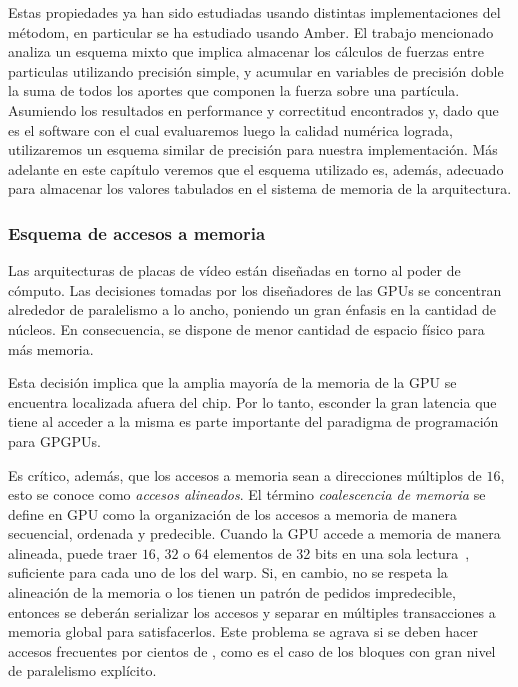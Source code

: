 Estas propiedades ya han sido estudiadas usando distintas implementaciones del métodom, en particular se ha estudiado usando Amber\cite{le2013spfp}. 
El trabajo mencionado analiza un esquema mixto que implica almacenar los cálculos de fuerzas entre particulas utilizando precisión simple, y acumular en variables de precisión doble
la suma de todos los aportes que componen la fuerza sobre una partícula. Asumiendo los resultados en performance y correctitud encontrados y,
dado que es el software con el cual evaluaremos luego la calidad numérica lograda, utilizaremos un esquema similar de precisión para nuestra implementación.
Más adelante en este capítulo veremos que el esquema utilizado es, además, adecuado para almacenar los valores tabulados en el sistema de memoria de la arquitectura.

\subsubsection{Esquema de accesos a memoria}

Las arquitecturas de placas de v\'ideo est\'an dise\~nadas en torno al poder de c\'omputo.
Las decisiones tomadas por los dise\~nadores de las GPUs se concentran alrededor de paralelismo a lo ancho, poniendo un gran \'enfasis en la cantidad de n\'ucleos.
En consecuencia, se dispone de menor cantidad de espacio f\'isico para m\'as memoria.

Esta decisi\'on implica que la amplia mayor\'ia de la memoria de la GPU se encuentra localizada afuera del chip.
Por lo tanto, esconder la gran latencia que tiene al acceder a la misma es parte importante del paradigma de programaci\'on para GPGPUs.

Es cr\'itico, adem\'as, que los accesos a memoria sean a direcciones m\'ultiplos de $16$, esto se conoce como \textit{accesos alineados}.
El t\'ermino \emph{coalescencia de memoria} se define en GPU como la organizaci\'on de los accesos a memoria de manera secuencial, ordenada y predecible.
Cuando la GPU accede a memoria de manera alineada, puede traer $16$, $32$ o $64$ elementos de 32 bits en una sola lectura~\cite{cudaProgrammingGuide}, suficiente para cada uno de los \threads{} del warp.
Si, en cambio, no se respeta la alineaci\'on de la memoria o los \threads{} tienen un patr\'on de pedidos impredecible, entonces se deber\'an serializar los accesos y separar en m\'ultiples transacciones a memoria global para satisfacerlos.
Este problema se agrava si se deben hacer accesos frecuentes por cientos de \threads{}, como es el caso de los bloques con gran nivel de paralelismo expl\'icito.

